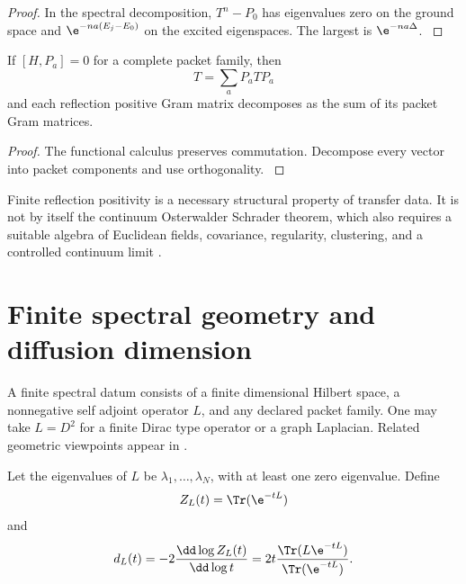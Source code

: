 \begin{proof}\label{strong:proof:060}
In the spectral decomposition, \(T^n-P_0\) has eigenvalues zero on the ground space and \(\e^{-na(E_j-E_0)}\) on the excited eigenspaces. The largest is \(\e^{-na\Delta}\).
\label{strong:proof:060:end}\end{proof}

\begin{proposition}\label{strong:proposition:008}\label{strong:prop:symmetry_transfer}
If \([H,P_a]=0\) for a complete packet family, then
\[
T=\sum_aP_aTP_a
\]
and each reflection positive Gram matrix decomposes as the sum of its packet Gram matrices.
\end{proposition}

\begin{proof}\label{strong:proof:061}
The functional calculus preserves commutation. Decompose every vector into packet components and use orthogonality.
\label{strong:proof:061:end}\end{proof}

Finite reflection positivity is a necessary structural property of transfer data. It is not by itself the continuum Osterwalder Schrader theorem, which also requires a suitable algebra of Euclidean fields, covariance, regularity, clustering, and a controlled continuum limit \cite{OsterwalderSchrader1973,OsterwalderSchrader1975,GlimmJaffe1987}.

\section{Finite spectral geometry and diffusion dimension}\label{strong:section:011}\label{strong:sec:spectral_geometry}

A finite spectral datum consists of a finite dimensional Hilbert space, a nonnegative self adjoint operator \(L\), and any declared packet family. One may take \(L=D^2\) for a finite Dirac type operator or a graph Laplacian. Related geometric viewpoints appear in \cite{Connes1994,Vassilevich2003}.

\begin{definition}\label{strong:definition:008}\label{strong:def:spectral_dimension}
Let the eigenvalues of \(L\) be \(\lambda_1,\ldots,\lambda_N\), with at least one zero eigenvalue. Define
\[
Z_L(t)=\Tr(\e^{-tL})
\]
and
\[
d_L(t)
=-2\frac{\dd\log Z_L(t)}{\dd\log t}
=
2t
\frac{\Tr(L\e^{-tL})}{\Tr(\e^{-tL})}.
\]
\end{definition}

